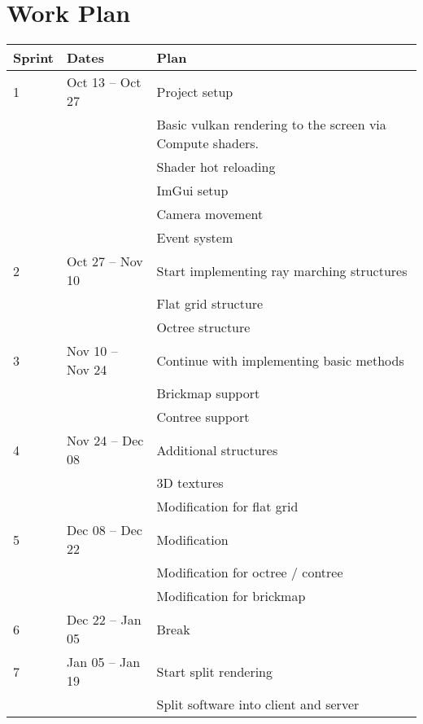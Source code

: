 \section*{Work Plan}






\begin{tabular}{lll}
  Sprint & Dates & Plan \\
  \hline
  1 & Oct 13 -- Oct 27 & Project setup \\
  && Basic vulkan rendering to the screen via Compute shaders. \\
  && Shader hot reloading \\
  && ImGui setup \\
  && Camera movement \\
  && Event system \\
  \hline
  2 & Oct 27 -- Nov 10 & Start implementing ray marching structures \\
  && Flat grid structure \\
  && Octree structure \\
  \hline
  3 & Nov 10 -- Nov 24 & Continue with implementing basic methods \\
  && Brickmap support \\
  && Contree support \\
  \hline
  4 & Nov 24 -- Dec 08 & Additional structures \\
  && 3D textures \\
  && Modification for flat grid \\
  \hline
  5 & Dec 08 -- Dec 22 & Modification \\
  && Modification for octree / contree \\
  && Modification for brickmap \\
  \hline
  6 & Dec 22 -- Jan 05 & Break \\
  \hline
  7 & Jan 05 -- Jan 19 & Start split rendering\\
  && Split software into client and server \\

\end{tabular}
